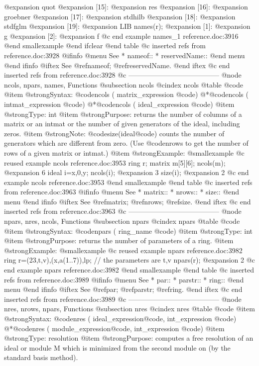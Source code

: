 {@expansion{}    quot
@expansion{} [15]:
@expansion{}    res
@expansion{} [16]:
@expansion{}    groebner
@expansion{} [17]:
@expansion{}    stdhilb
@expansion{} [18]:
@expansion{}    stdfglm
@expansion{} [19]:
@expansion{}    LIB
  names(r);
@expansion{} [1]:
@expansion{}    g
@expansion{} [2]:
@expansion{}    f
@c end example names_1 reference.doc:3916
@end smallexample
@end ifclear
@end table
@c inserted refs from reference.doc:3928
@ifinfo
@menu
See
* nameof::
* reservedName::
@end menu
@end ifinfo
@iftex
See
@ref{nameof};
@ref{reservedName}.
@end iftex
@c end inserted refs from reference.doc:3928
@c ---------------------------------------
@node ncols, npars, names, Functions
@subsection ncols
@cindex ncols
@table @code
@item @strong{Syntax:}
@code{ncols (} matrix_expression @code{)}
@*@code{ncols (} intmat_expression @code{)}
@*@code{ncols (} ideal_expression @code{)}
@item @strong{Type:}
int
@item @strong{Purpose:}
returns the number of columns of a matrix or an intmat or the number of
given generators of the ideal, including zeros.
@item @strong{Note:}
@code{size(}ideal@code{)} counts the number of generators
which are different from zero. (Use @code{nrows} to get the number of rows
of a given matrix or intmat.)
@item @strong{Example:}
@smallexample
@c reused example ncols reference.doc:3953 
  ring r;
  matrix m[5][6];
  ncols(m);
@expansion{} 6
  ideal i=x,0,y;
  ncols(i);
@expansion{} 3
  size(i);
@expansion{} 2
@c end example ncols reference.doc:3953
@end smallexample
@end table
@c inserted refs from reference.doc:3963
@ifinfo
@menu
See
* matrix::
* nrows::
* size::
@end menu
@end ifinfo
@iftex
See
@ref{matrix};
@ref{nrows};
@ref{size}.
@end iftex
@c end inserted refs from reference.doc:3963
@c ---------------------------------------
@node npars, nres, ncols, Functions
@subsection npars
@cindex npars
@table @code
@item @strong{Syntax:}
@code{npars (} ring_name @code{)}
@item @strong{Type:}
int
@item @strong{Purpose:}
returns the number of parameters of a ring.
@item @strong{Example:}
@smallexample
@c reused example npars reference.doc:3982 
  ring r=(23,t,v),(x,a(1..7)),lp;
  // the parameters are t,v
  npars(r);
@expansion{} 2
@c end example npars reference.doc:3982
@end smallexample
@end table
@c inserted refs from reference.doc:3989
@ifinfo
@menu
See
* par::
* parstr::
* ring::
@end menu
@end ifinfo
@iftex
See
@ref{par};
@ref{parstr};
@ref{ring}.
@end iftex
@c end inserted refs from reference.doc:3989
@c ---------------------------------------
@node  nres, nrows, npars, Functions
@subsection nres
@cindex nres
@table @code
@item @strong{Syntax:}
@code{nres (} ideal_expression@code{,} int_expression @code{)}
@*@code{nres (} module_expression@code{,} int_expression @code{)}
@item @strong{Type:}
resolution
@item @strong{Purpose:}
computes a free resolution of an ideal or module M which is minimized from
the second module on (by the standard basis method).

}
